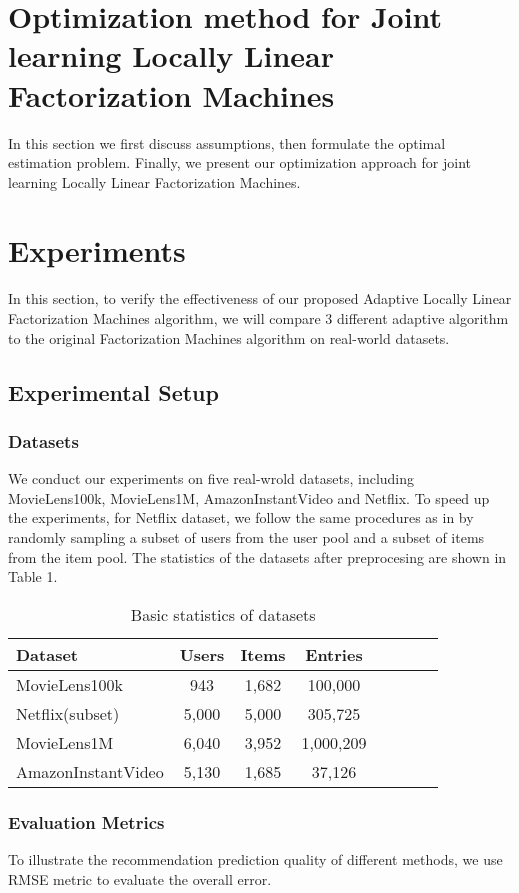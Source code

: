\documentclass{article}
\begin{document}
\section{Optimization method for Joint learning Locally Linear Factorization Machines}
In this section we first discuss assumptions, then formulate the optimal estimation problem. Finally, we present our optimization approach for joint learning Locally Linear Factorization Machines.

\section{Experiments}
In this section, to verify the effectiveness of our proposed Adaptive Locally Linear Factorization Machines algorithm, we will compare 3 different adaptive algorithm to the original Factorization Machines algorithm on real-world datasets.
\subsection{Experimental Setup}
\subsubsection{Datasets}
We conduct our experiments on five real-wrold datasets, including MovieLens100k, MovieLens1M, AmazonInstantVideo and Netflix. To speed up the experiments, for  Netflix dataset, we follow the same procedures as in \cite{pan2013gbpr} by randomly sampling a subset of users from the user pool and a subset of items from the item pool. The statistics of the datasets after preprocesing are shown in Table 1.
\begin{table}
	\caption{Basic statistics of datasets}
	\begin{tabular}{l*{6}{c}r}
		\hline
		Dataset              & Users & Items & Entries \\
		\hline
		MovieLens100k 		   	& 943 & 1,682 & 100,000  \\
		Netflix(subset)     	& 5,000 & 5,000 & 305,725   \\
		MovieLens1M            	& 6,040 & 3,952 & 1,000,209  \\
		AmazonInstantVideo      & 5,130 & 1,685 & 37,126  \\
	\end{tabular}
\end{table}
\subsubsection{Evaluation Metrics}
To illustrate the recommendation prediction quality of different methods, we use RMSE metric to evaluate the overall error.
\end{document}
